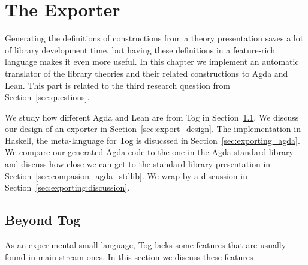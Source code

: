 \chapter{The Exporter}
\label{ch:export}


Generating the definitions of constructions from a theory presentation saves a lot of library development time, but having these definitions in a feature-rich language makes it even more useful. In this chapter we implement an automatic translator of the library theories and their related constructions to Agda and Lean. This part is related to the third research question from Section~\ref{sec:questions}. 

We study how different Agda and Lean are from Tog in Section~\ref{sec:beyongTog}. We discuss our design of an exporter in Section~\ref{sec:export_design}. The implementation in Haskell, the meta-language for Tog is disucssed in Section~\ref{sec:exporting_agda}. We compare our generated Agda code to the one in the Agda standard library~\cite{agda_stdlib} and discuss how close we can get to the standard library presentation in Section~\ref{sec:compasion_agda_stdlib}. 
We wrap by a discussion in Section~\ref{sec:exporting:discussion}. 

\section{Beyond Tog}
\label{sec:beyongTog}
As an experimental small language, Tog lacks some features that are usually found in main stream ones. In this section we discuss these features 

